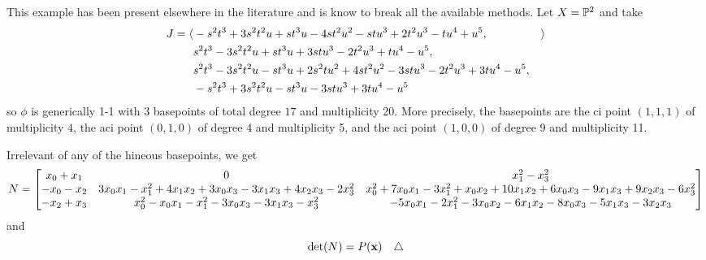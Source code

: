 \documentclass[fleqn,reqno]{amsart}
\numberwithin{first}{chapter}
\begin{document}
\begin{example}[$\mt{ex213}$]
\label{ex213}
This example has been present elsewhere in the literature and is know to break all the available methods.
Let $X=\mathbb{P}^2$ and take
\begin{align*}
	J=\langle &-s^{2} t^{3}+3 s^{2} t^{2} u+s t^{3} u-4 s t^{2} u^{2}-s t
	      u^{3}+2 t^{2} u^{3}-t u^{4}+u^{5}, &\rangle\\
		  &s^{2} t^{3}-3 s^{2} t^{2} u+s t^{3} u+3 s t
	      u^{3}-2 t^{2} u^{3}+t u^{4}-u^{5},\\
		  &s^{2} t^{3}-3 s^{2} t^{2} u-s t^{3} u+2
	      s^{2} t u^{2}+4 s t^{2} u^{2}-3 s t u^{3}-2 t^{2} u^{3}+3 t u^{4}-u^{5},\\
		  &-s^{2}
	      t^{3}+3 s^{2} t^{2} u-s t^{3} u-3 s t u^{3}+3 t u^{4}-u^{5}
\end{align*}
so $\phi$ is generically 1-1 with 3 basepoints of total degree $17$
and multiplicity 20. More precisely, the basepoints are the ci point $(1,1,1)$ of multiplicity $4$,
the aci point $(0,1,0)$ of degree 4 and multiplicity 5, and
the aci point $(1,0,0)$ of degree 9 and multiplicity 11.

Irrelevant of any of the hineous basepoints, we get
\[
	N=\bgroup\begin{bmatrix}{x}_{0}+{x}_{1}&
      0&
      {x}_{1}^{2}-{x}_{3}^{2}\\
      -{x}_{0}-{x}_{2}&
      3 {x}_{0} {x}_{1}-{x}_{1}^{2}+4 {x}_{1} {x}_{2}+3 {x}_{0} {x}_{3}-3 {x}_{1} {x}_{3}+4 {x}_{2} {x}_{3}-2 {x}_{3}^{2}&
      {x}_{0}^{2}+7 {x}_{0} {x}_{1}-3 {x}_{1}^{2}+{x}_{0} {x}_{2}+10 {x}_{1} {x}_{2}+6 {x}_{0} {x}_{3}-9 {x}_{1} {x}_{3}+9 {x}_{2} {x}_{3}-6 {x}_{3}^{2}\\
      -{x}_{2}+{x}_{3}&
      {x}_{0}^{2}-{x}_{0} {x}_{1}-{x}_{1}^{2}-3 {x}_{0} {x}_{3}-3 {x}_{1} {x}_{3}-{x}_{3}^{2}&
      -5 {x}_{0} {x}_{1}-2 {x}_{1}^{2}-3 {x}_{0} {x}_{2}-6 {x}_{1} {x}_{2}-8 {x}_{0} {x}_{3}-5 {x}_{1} {x}_{3}-3 {x}_{2} {x}_{3}\\
      \end{bmatrix}\egroup
\]
and
\[
	\det(N)=P(\mathbf x) \demo
\]
\end{example}





\end{document}
